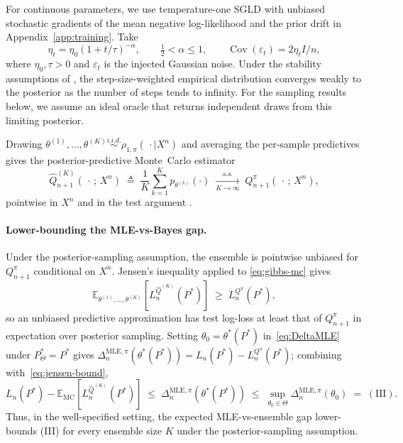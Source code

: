For continuous parameters, we use temperature-one SGLD with unbiased
stochastic gradients of the mean negative log-likelihood and the prior drift in
Appendix~\ref{app:training}. Take
\[
\eta_t=\eta_0(1+t/\tau)^{-\alpha},\qquad
\tfrac12<\alpha\le1,\qquad
\operatorname{Cov}(\varepsilon_t)=2\eta_t I/n,
\]
where $\eta_0,\tau>0$ and $\varepsilon_t$ is the injected Gaussian noise.
Under the stability assumptions of \citet[Theorem~7]{teh2016sgld},
the step-size-weighted empirical distribution converges weakly to the posterior
as the number of steps tends to infinity.
For the sampling results below, we assume an ideal oracle that returns
independent draws from this limiting posterior.

Drawing
$\theta^{(1)},\dots,\theta^{(K)}\stackrel{\textit{i.i.d.}}{\sim}\rho_{1,\pi}(\,\cdot\mid X^n)$
and averaging the per-sample predictives gives the posterior-predictive Monte~Carlo
estimator
\begin{equation}
\widehat Q^{(K)}_{n+1}(\,\cdot\,;\,X^n)
\;\triangleq\; \frac{1}{K}\sum_{k=1}^{K} p_{\theta^{(k)}}(\cdot)
\;\xrightarrow[K\to\infty]{\text{a.s.}}\;
Q^\pi_{n+1}(\,\cdot\,;\,X^n),
\label{eq:gibbs-mc}
\end{equation}
pointwise in $X^n$ and in the test argument \citep[Ch.~6]{robert2007bayesian}.

\paragraph{Lower-bounding the MLE-vs-Bayes gap.}
Under the posterior-sampling assumption, the ensemble is pointwise
unbiased for $Q^\pi_{n+1}$ conditional on $X^n$.
Jensen's inequality applied to \eqref{eq:gibbs-mc} gives
\begin{equation}
\mathbb{E}_{\theta^{(1)},\ldots,\theta^{(K)}}\!\left[L^{\widehat Q^{(K)}}_n(P^*)\right]
\;\ge\; L^{Q^\pi}_n(P^*),
\label{eq:jensen-bound}
\end{equation}
so an unbiased predictive approximation has test log-loss at least that of
$Q^\pi_{n+1}$ in expectation over posterior sampling. Setting $\theta_0=\theta^*(P^*)$
in~\eqref{eq:DeltaMLE} under $P^*_\Theta=P^*$ gives
$\Delta^{\mathrm{MLE},\pi}_n(\theta^*(P^*))=L_n(P^*)-L^{Q^\pi}_n(P^*)$;
combining with~\eqref{eq:jensen-bound},
\begin{equation}
L_n(P^*) - \mathbb{E}_{\mathrm{MC}}\!\left[L^{\widehat Q^{(K)}}_n(P^*)\right]
\;\le\; \Delta^{\mathrm{MLE},\pi}_n(\theta^*(P^*))
\;\le\; \sup_{\theta_0\in\Theta}\Delta^{\mathrm{MLE},\pi}_n(\theta_0)
\;=\; (\mathrm{III}).
\label{eq:gap-lower-bounds-III}
\end{equation}
Thus, in the well-specified setting, the expected MLE-vs-ensemble gap
lower-bounds (III) for every ensemble size $K$ under the posterior-sampling
assumption.
